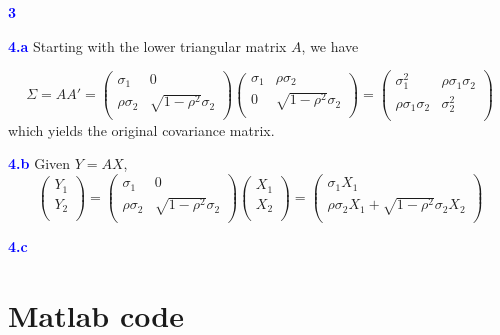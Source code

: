 \documentclass[a4paper,11pt] {article}
\begin{document}
\textcolor{blue}{\bf 3 }

\textcolor{blue}{\bf 4.a } Starting with the lower triangular matrix $A$, we have

$$
\Sigma = AA' =
\left(
  \begin{array}{cc}
    \sigma_1 & 0 \\
    \rho \sigma_2 & \sqrt{1-\rho^2}\sigma_2 \\
  \end{array}
\right)
\left(
  \begin{array}{cc}
    \sigma_1 & \rho \sigma_2 \\
    0 & \sqrt{1-\rho^2}\sigma_2 \\
  \end{array}
\right)
=
\left(
  \begin{array}{cc}
    \sigma_1^2 & \rho \sigma_1 \sigma_2 \\
    \rho \sigma_1 \sigma_2 & \sigma_2^2 \\
  \end{array}
\right)
$$
which yields the original covariance matrix.

\textcolor{blue}{\bf 4.b } Given $Y = AX$,
$$
\left(
  \begin{array}{c}
    Y_1 \\
    Y_2 \\
  \end{array}
\right)
=
\left(
  \begin{array}{cc}
    \sigma_1 & 0 \\
    \rho \sigma_2 & \sqrt{1-\rho^2}\sigma_2 \\
  \end{array}
\right)
\left(
  \begin{array}{c}
    X_1 \\
    X_2 \\
  \end{array}
\right)
=
\left(
  \begin{array}{c}
    \sigma_1 X_1 \\
    \rho \sigma_2 X_1 + \sqrt{1-\rho^2} \sigma_2 X_2 \\
  \end{array}
\right)
$$

\textcolor{blue}{\bf 4.c }

\section*{Matlab code}
\begin{spacing}{0.9}
%
\end{spacing}
\end{document}
